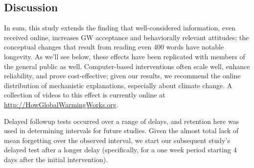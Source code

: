 \subsection{Discussion}

In sum, this study extends the finding that well-considered information, even
received online, increases GW acceptance and behaviorally relevant attitudes;
the conceptual changes that result from reading even 400 words have notable
longevity. As we'll see below, these effects have been replicated with members
of the general public as well. Computer-based interventions often scale well,
enhance reliability, and prove cost-effective; given our results, we recommend
the online distribution of mechanistic explanations, especially about climate
change. A collection of videos to this effect is currently online at
\url{http://HowGlobalWarmingWorks.org}.

Delayed followup tests occurred over a range of delays, and retention here was
used in determining intervals for future studies.  Given the almost total lack
of mean forgetting over the observed interval, we start our subsequent
study's delayed test after a longer delay (specifically, for a one week period
starting 4 days after the initial intervention).

